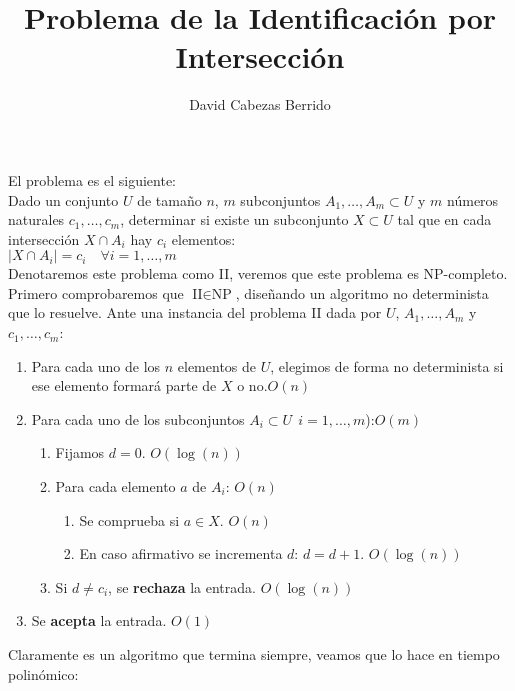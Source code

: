 \documentclass{article}
\author{David Cabezas Berrido}
\date{\vspace{-5mm}}
\title{Problema de la Identificación por Intersección\vspace{-2mm}}
\begin{document}
\maketitle

El problema es el siguiente:\\

Dado un conjunto $U$ de tamaño $n$, $m$ subconjuntos
$A_1,\ldots,A_m\subset U$ y $m$ números naturales
$c_1,\ldots,c_m$, determinar si existe un subconjunto $X\subset U$ tal
que en cada intersección $X\cap A_i$ hay $c_i$ elementos: \\
$|X\cap A_i|=c_i\quad\forall i=1,\ldots,m$ \\

Denotaremos este problema como II, veremos que este problema
es NP-completo. \\

Primero comprobaremos que $\text{II} \in \text{NP}$, diseñando un
algoritmo no determinista que lo resuelve. Ante una instancia del
problema II dada por $U$, $A_1,\ldots,A_m$ y
$c_1,\ldots,c_m$:

\begin{enumerate}
\item Para cada uno de los $n$ elementos de $U$, elegimos de forma no
  determinista si ese elemento formará parte de $X$ o no.\qquad\textcolor{webred}{$O(n)$}
\item Para cada uno de los subconjuntos $A_i\subset U\ \ i=1,\ldots,m$):\qquad\textcolor{webred}{$O(m)$}
  \begin{enumerate}
  \item Fijamos $d=0$. \qquad\textcolor{webred}{$O(\log(n))$}
  \item Para cada elemento $a$ de $A_i$: \qquad\textcolor{webred}{$O(n)$}
    \begin{enumerate}
    \item Se comprueba si $a\in X$. \quad\textcolor{webred}{$O(n)$}
    \item En caso afirmativo se incrementa $d$: $d=d+1$. \qquad\textcolor{webred}{$O(\log(n))$}
    \end{enumerate}
  \item Si $d\neq c_i$, se \textbf{rechaza} la entrada. \qquad\textcolor{webred}{$O(\log(n))$}
  \end{enumerate}
\item Se \textbf{acepta} la entrada. \qquad\textcolor{webred}{$O(1)$}
\end{enumerate}

Claramente es un algoritmo que termina siempre, veamos que lo hace en
tiempo polinómico: \\
\end{document}
